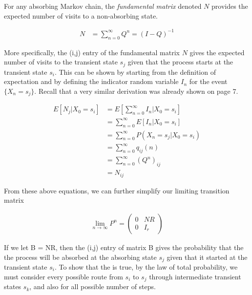\documentclass[a4paper,12pt]{article}
\theoremstyle{definition}
\begin{document}
	For any absorbing Markov chain, the \emph{fundamental matrix} denoted $N$ provides the expected number of visits to a non-absorbing 
	state. 

	\begin{equation*}
	\begin{aligned}
	 	N &= \sum_{n=0}^\infty Q^n = (I-Q)^{-1}
	\end{aligned}
	\end{equation*}	
	
	More specifically, the (i,j) entry of the fundamental matrix $N$ gives the expected number of visits to the transient state $s_j$ 
	given that the process starts at the transient state $s_i$. This can be shown by starting from the definition of expectation and 
	by defining the indicator random variable $I_n$ for the event $\{X_n = s_j\}$. Recall that a very similar derivation was already 
	shown on page 7.

	\begin{equation*}
	\begin{aligned}
		 E[N_j|X_0 = s_i] &= E\left[\sum_{n=0}^\infty I_n | X_0 = s_i\right] \\
		 				  &= \sum_{n=0}^\infty E\left[I_n | X_0 = s_i\right] \\
		 				  &= \sum_{n=0}^\infty P(X_n = s_j | X_0 = s_i) \\
		 				  &= \sum_{n=0}^\infty q_{ij}(n) \\
		 				  &= \sum_{n=0}^\infty (Q^n)_{ij} \\
		 				  &= N_{ij}
	\end{aligned}
	\end{equation*}

	From these above equations, we can further simplify our limiting transition matrix

	\begin{equation*}
		\begin{aligned}
			\lim_{n\to\infty}P^n = \left(
			\begin{array}{c|c}
			0 & NR \\
			\hline
			0 & I_r
			\end{array}
			\right)
		\end{aligned}
	\end{equation*}

	If we let B = NR, then the (i,j) entry of matrix B gives the probability that the the process will be absorbed at the absorbing 
	state $s_j$ given that it started at the transient state $s_i$. To show that the is true, by the law of total probability, we must 
	consider every possible route from $s_i$ to $s_j$ through intermediate transient states $s_k$, and also for all possible number of steps.
\end{document}
